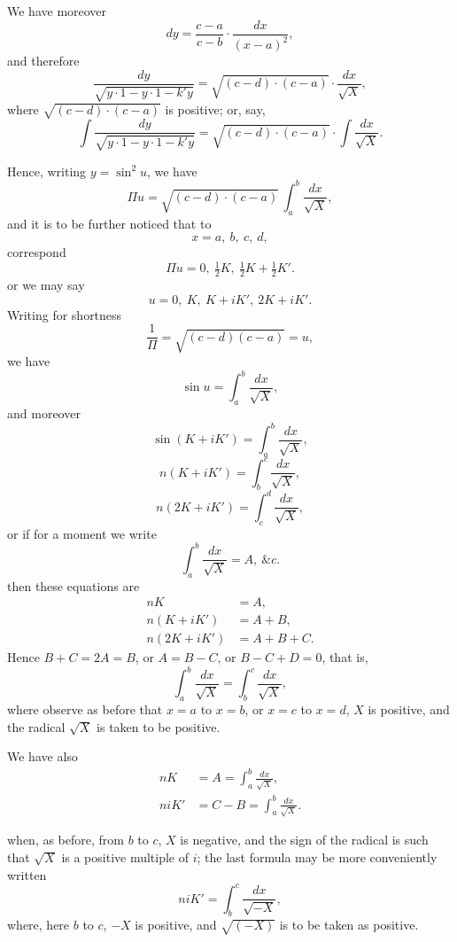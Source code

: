\documentclass[11pt,a4paper]{book}
\begin{document}
We have moreover
\[
dy=\frac{c-a}{c-b}\cdot\frac{dx}{(x-a)^2},
\]
and therefore
\[
\frac{dy}{\sqrt{y\cdot 1-y\cdot 1-k'y}}=\sqrt{(c-d)\cdot(c-a)}\cdot\frac{dx}{\sqrt{X}},
\]
where $\sqrt{(c-d)\cdot(c-a)}$ is positive; or, say,
\[
\int\frac{dy}{\sqrt{y\cdot 1-y\cdot 1-k'y}}=\sqrt{(c-d)\cdot(c-a)}\cdot\int\frac{dx}{\sqrt{X}}.
\]


\newpage
Hence, writing $y=\sin^2 u$, we have
\[
\Pi u=\sqrt{(c-d)\cdot(c-a)}\,\int_a^b\frac{dx}{\sqrt{X}},
\]
and it is to be further noticed that to
\[
x=a,\ b,\ c,\ d,
\]
correspond
\[
\Pi u=0,\ \tfrac{1}{2}K,\ \tfrac{1}{2}K+\tfrac{1}{2}K'.
\]
or we may say
\[
u=0,\ K,\ K+iK',\ 2K+iK'.
\]
Writing for shortness
\[
\frac{1}{\Pi}=\sqrt{(c-d)(c-a)}=u,
\]
we have
\[
\sin u=\int_a^b\frac{dx}{\sqrt{X}},
\]
and moreover
\[
\sin(K+iK')=\int_a^b\frac{dx}{\sqrt{X}},
\]
\[
n(K+iK')=\int_b^c\frac{dx}{\sqrt{X}},
\]
\[
n(2K+iK')=\int_c^d\frac{dx}{\sqrt{X}},
\]
or if for a moment we write
\[
\int_a^b\frac{dx}{\sqrt{X}}=A,\ \&c.
\]
then these equations are
\begin{align*}
nK&=A,\\
n(K+iK')&=A+B,\\
n(2K+iK')&=A+B+C.
\end{align*}
Hence $B+C=2A=B$, or $A=B-C$, or $B-C+D=0$, that is,
\[
\int_a^b\frac{dx}{\sqrt{X}}=\int_b^c\frac{dx}{\sqrt{X}},
\]
where observe as before that $x=a$ to $x=b$, or $x=c$ to $x=d$, $X$ is positive, and the radical $\sqrt{X}$ is taken to be positive.

We have also
\begin{align*}
nK&=A=\int_a^b\frac{dx}{\sqrt{X}},\\
niK'&=C-B=\int_a^b\frac{dx}{\sqrt{X}}.
\end{align*}

\newpage
when, as before, from $b$ to $c$, $X$ is negative, and the sign of the radical is such that $\sqrt{X}$ is a positive multiple of $i$; the last formula may be more conveniently written
\[
n iK'=\int_b^c\frac{dx}{\sqrt{-X}},
\]
where, here $b$ to $c$, $-X$ is positive, and $\sqrt{(-X)}$ is to be taken as positive.
\end{document}
